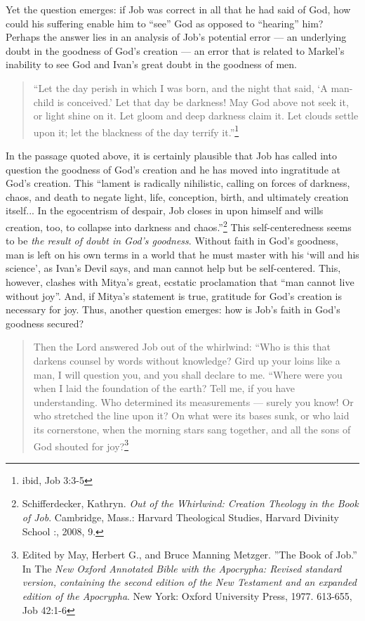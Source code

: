 Yet the question emerges: if Job was correct in all that he had said of God, how could his suffering enable him to ``see'' God as opposed to ``hearing'' him? Perhaps the answer lies in an analysis of Job's potential error --- an underlying doubt in the goodness of God's creation --- an error that is related to Markel's inability to see God and Ivan's great doubt in the goodness of men.

\begin{quote}
\onehalfspacing
``Let the day perish in which I was born, and the night that said, `A man-child is conceived.' Let that day be darkness! May God above not seek it, or light shine on it. Let gloom and deep darkness claim it. Let clouds settle upon it; let the blackness of the day terrify it.''\footnote{ibid, Job 3:3-5}
\end{quote}

In the passage quoted above, it is certainly plausible that Job has called into question the goodness of God's creation and he has moved into ingratitude at God's creation. This ``lament is radically nihilistic, calling on forces of darkness, chaos, and death to negate light, life, conception, birth, and ultimately creation itself... In the egocentrism of despair, Job closes in upon himself and wills creation, too, to collapse into darkness and chaos.''\footnote{Schifferdecker, Kathryn. \emph{Out of the Whirlwind: Creation Theology in the Book of Job}. Cambridge, Mass.: Harvard Theological Studies, Harvard Divinity School :, 2008, 9.} This self-centeredness seems to be \emph{the result of doubt in God's goodness}. Without faith in God's goodness, man is left on his own terms in a world that he must master with his `will and his science', as Ivan's Devil says, and man cannot help but be self-centered. This, however, clashes with Mitya's great, ecstatic proclamation that ``man cannot live without joy''. And, if Mitya's statement is true, gratitude for God's creation is necessary for joy. Thus, another question emerges: how is Job's faith in God's goodness secured?  


\begin{quote}
Then the Lord answered Job out of the whirlwind: ``Who is this that darkens counsel by words without knowledge? Gird up your loins like a man, I will question you, and you shall declare to me. ``Where were you when I laid the foundation of the earth? Tell me, if you have understanding. Who determined its measurements --- surely you know! Or who stretched the line upon it? On what were its bases sunk, or who laid its cornerstone, when the morning stars sang together, and all the sons of God shouted for joy?\footnote{Edited by May, Herbert G., and Bruce Manning Metzger. ''The Book of Job.'' In The \emph{New Oxford Annotated Bible with the Apocrypha: Revised standard version, containing the second edition of the New Testament and an expanded edition of the Apocrypha}. New York: Oxford University Press, 1977. 613-655, Job 42:1-6}
\end{quote}

